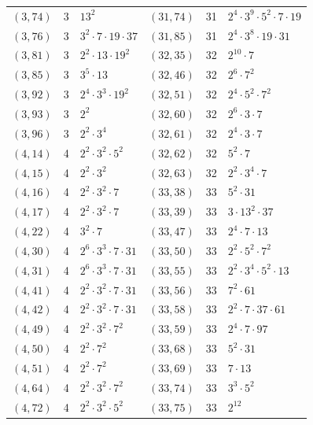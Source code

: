 \documentclass[11pt]{article}
\begin{document}
\begin{longtable}{@{}lrl@{\qquad}lrl@{}}
$(3,74)$ & 3 & $13^{2}$ & $(31,74)$ & 31 & $2^{4}\cdot 3^{9}\cdot 5^{2}\cdot 7\cdot 19$\\
$(3,76)$ & 3 & $3^{2}\cdot 7\cdot 19\cdot 37$ & $(31,85)$ & 31 & $2^{4}\cdot 3^{8}\cdot 19\cdot 31$\\
$(3,81)$ & 3 & $2^{2}\cdot 13\cdot 19^{2}$ & $(32,35)$ & 32 & $2^{10}\cdot 7$\\
$(3,85)$ & 3 & $3^{5}\cdot 13$ & $(32,46)$ & 32 & $2^{6}\cdot 7^{2}$\\
$(3,92)$ & 3 & $2^{4}\cdot 3^{3}\cdot 19^{2}$ & $(32,51)$ & 32 & $2^{4}\cdot 5^{2}\cdot 7^{2}$\\
$(3,93)$ & 3 & $2^{2}$ & $(32,60)$ & 32 & $2^{6}\cdot 3\cdot 7$\\
$(3,96)$ & 3 & $2^{2}\cdot 3^{4}$ & $(32,61)$ & 32 & $2^{4}\cdot 3\cdot 7$\\
$(4,14)$ & 4 & $2^{2}\cdot 3^{2}\cdot 5^{2}$ & $(32,62)$ & 32 & $5^{2}\cdot 7$\\
$(4,15)$ & 4 & $2^{2}\cdot 3^{2}$ & $(32,63)$ & 32 & $2^{2}\cdot 3^{4}\cdot 7$\\
$(4,16)$ & 4 & $2^{2}\cdot 3^{2}\cdot 7$ & $(33,38)$ & 33 & $5^{2}\cdot 31$\\
$(4,17)$ & 4 & $2^{2}\cdot 3^{2}\cdot 7$ & $(33,39)$ & 33 & $3\cdot 13^{2}\cdot 37$\\
$(4,22)$ & 4 & $3^{2}\cdot 7$ & $(33,47)$ & 33 & $2^{4}\cdot 7\cdot 13$\\
$(4,30)$ & 4 & $2^{6}\cdot 3^{3}\cdot 7\cdot 31$ & $(33,50)$ & 33 & $2^{2}\cdot 5^{2}\cdot 7^{2}$\\
$(4,31)$ & 4 & $2^{6}\cdot 3^{3}\cdot 7\cdot 31$ & $(33,55)$ & 33 & $2^{2}\cdot 3^{4}\cdot 5^{2}\cdot 13$\\
$(4,41)$ & 4 & $2^{2}\cdot 3^{2}\cdot 7\cdot 31$ & $(33,56)$ & 33 & $7^{2}\cdot 61$\\
$(4,42)$ & 4 & $2^{2}\cdot 3^{2}\cdot 7\cdot 31$ & $(33,58)$ & 33 & $2^{2}\cdot 7\cdot 37\cdot 61$\\
$(4,49)$ & 4 & $2^{2}\cdot 3^{2}\cdot 7^{2}$ & $(33,59)$ & 33 & $2^{4}\cdot 7\cdot 97$\\
$(4,50)$ & 4 & $2^{2}\cdot 7^{2}$ & $(33,68)$ & 33 & $5^{2}\cdot 31$\\
$(4,51)$ & 4 & $2^{2}\cdot 7^{2}$ & $(33,69)$ & 33 & $7\cdot 13$\\
$(4,64)$ & 4 & $2^{2}\cdot 3^{2}\cdot 7^{2}$ & $(33,74)$ & 33 & $3^{3}\cdot 5^{2}$\\
$(4,72)$ & 4 & $2^{2}\cdot 3^{2}\cdot 5^{2}$ & $(33,75)$ & 33 & $2^{12}$\\

\end{longtable}
\end{document}
